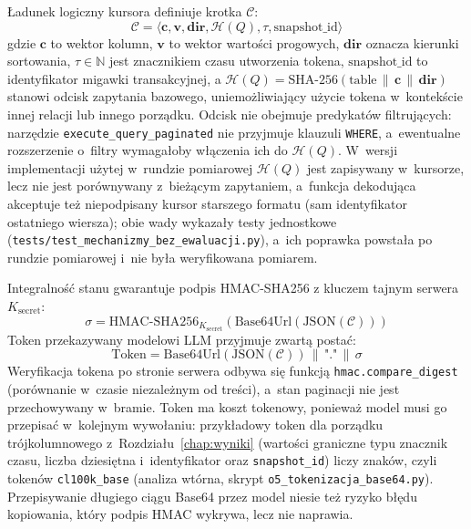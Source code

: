 Ładunek logiczny kursora definiuje krotka $\mathcal{C}$:
\begin{equation}
\mathcal{C} = \langle \mathbf{c}, \mathbf{v}, \mathbf{dir}, \mathcal{H}(Q), \tau, \text{snapshot\_id} \rangle
\label{eq:cursor_payload}
\end{equation}
gdzie $\mathbf{c}$ to wektor kolumn, $\mathbf{v}$ to wektor wartości progowych, $\mathbf{dir}$ oznacza kierunki sortowania, $\tau \in \mathbb{N}$ jest znacznikiem czasu utworzenia tokena, $\text{snapshot\_id}$ to identyfikator migawki transakcyjnej, a $\mathcal{H}(Q) = \text{SHA-256}(\text{table} \,\|\, \mathbf{c} \,\|\, \mathbf{dir})$ stanowi odcisk zapytania bazowego, uniemożliwiający użycie tokena w~kontekście innej relacji lub innego porządku. Odcisk nie obejmuje predykatów filtrujących: narzędzie \texttt{execute\_query\_paginated} nie przyjmuje klauzuli \texttt{WHERE}, a~ewentualne rozszerzenie o~filtry wymagałoby włączenia ich do $\mathcal{H}(Q)$. W~wersji implementacji użytej w~rundzie pomiarowej $\mathcal{H}(Q)$ jest zapisywany w~kursorze, lecz nie jest porównywany z~bieżącym zapytaniem, a~funkcja dekodująca akceptuje też niepodpisany kursor starszego formatu (sam identyfikator ostatniego wiersza); obie wady wykazały testy jednostkowe (\texttt{tests/test\_mechanizmy\_bez\_ewaluacji.py}), a~ich poprawka powstała po rundzie pomiarowej i~nie była weryfikowana pomiarem.

Integralność stanu gwarantuje podpis HMAC-SHA256 z kluczem tajnym serwera $K_{\text{secret}}$:
\begin{equation}
\sigma = \text{HMAC-SHA256}_{K_{\text{secret}}}(\text{Base64Url}(\text{JSON}(\mathcal{C})))
\label{eq:cursor_signature}
\end{equation}
Token przekazywany modelowi LLM przyjmuje zwartą postać:
\begin{equation}
\text{Token} = \text{Base64Url}(\text{JSON}(\mathcal{C})) \,\|\, \text{"."} \,\|\, \sigma
\label{eq:cursor_token_format}
\end{equation}
Weryfikacja tokena po stronie serwera odbywa się funkcją \texttt{hmac.compare\_digest} (porównanie w~czasie niezależnym od treści), a~stan paginacji nie jest przechowywany w~bramie. Token ma koszt tokenowy, ponieważ model musi go przepisać w~kolejnym wywołaniu: przykładowy token dla porządku trójkolumnowego z~Rozdziału~\ref{chap:wyniki} (wartości graniczne typu znacznik czasu, liczba dziesiętna i~identyfikator oraz \texttt{snapshot\_id}) liczy \wynOfiveCursorChars{} znaków, czyli \wynOfiveCursorTokens{} tokenów \texttt{cl100k\_base} (analiza wtórna, skrypt \texttt{o5\_tokenizacja\_base64.py}). Przepisywanie długiego ciągu Base64 przez model niesie też ryzyko błędu kopiowania, który podpis HMAC wykrywa, lecz nie naprawia.

